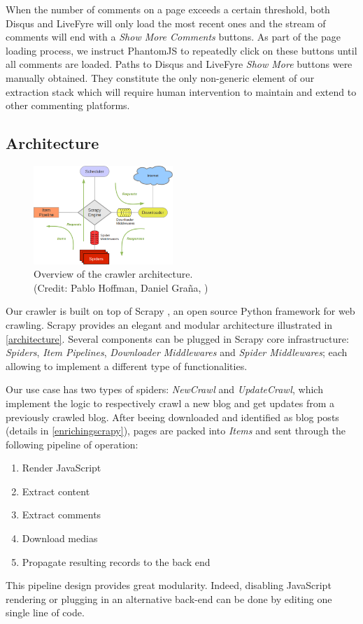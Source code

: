 When the number of comments on a page exceeds a certain threshold, both Disqus and LiveFyre will only load the most recent ones and the stream of comments will end with a \emph{Show More Comments} buttons. As part of the page loading process, we instruct PhantomJS to repeatedly click on these buttons until all comments are loaded. Paths to Disqus and LiveFyre \emph{Show More} buttons were manually obtained. They constitute the only non-generic element of our extraction stack which will require human intervention to maintain and extend to other commenting platforms.


\subsection{Architecture}

\begin{figure}
  \capstart
  \centering
  \includegraphics[width=0.47\textwidth]{img/scrapy_architecture.png}
  \caption{Overview of the crawler architecture.\\(Credit: Pablo Hoffman, Daniel Graña, \cite{scrapy2013})}
  \label{architecture}
\end{figure}

Our crawler is built on top of Scrapy \cite{scrapy2013}, an open source Python framework for web crawling. Scrapy provides an elegant and modular architecture illustrated in \autoref{architecture}. Several components can be plugged in Scrapy core infrastructure: \emph{Spiders}, \emph{Item Pipelines}, \emph{Downloader Middlewares} and \emph{Spider Middlewares}; each allowing to implement a different type of functionalities.

Our use case has two types of spiders: \emph{NewCrawl} and \emph{UpdateCrawl}, which implement the logic to respectively crawl a new blog and get updates from a previously crawled blog. After beeing downloaded and identified as blog posts (details in \ref{enrichingscrapy}), pages are packed into \emph{Items} and sent through the following pipeline of operation:
\begin{enumerate}[noitemsep]
  \item Render JavaScript
  \item Extract content
  \item Extract comments
  \item Download medias
  \item Propagate resulting records to the back end
\end{enumerate}
This pipeline design provides great modularity. Indeed, disabling JavaScript rendering or plugging in an alternative back-end can be done by editing one single line of code.


